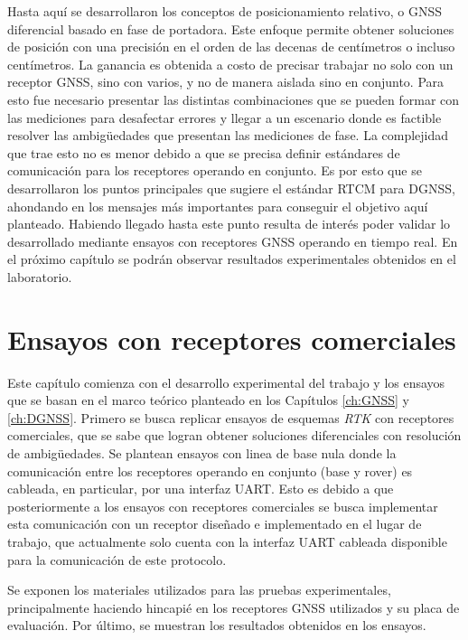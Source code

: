 \documentclass[a4paper,12pt,oneside,onecolumn,final,openright]{book}%
\begin{document}
	Hasta aquí se desarrollaron los conceptos de posicionamiento relativo, o GNSS diferencial basado en fase de portadora. Este enfoque permite obtener soluciones de posición con una precisión en el orden de las decenas de centímetros o incluso centímetros. La ganancia es obtenida a costo de precisar trabajar no solo con un receptor GNSS, sino con varios, y no de manera aislada sino en conjunto. Para esto fue necesario presentar las distintas combinaciones que se pueden formar con las mediciones para desafectar errores y llegar a un escenario donde es factible resolver las ambigüedades que presentan las mediciones de fase. La complejidad que trae esto no es menor debido a que se precisa definir estándares de comunicación para los receptores operando en conjunto. Es por esto que se desarrollaron los puntos principales que sugiere el estándar RTCM para DGNSS, ahondando en los mensajes más importantes para conseguir el objetivo aquí planteado. Habiendo llegado hasta este punto resulta de interés poder validar lo desarrollado mediante ensayos con receptores GNSS operando en tiempo real. En el próximo capítulo se podrán observar resultados experimentales obtenidos en el laboratorio.
\chapter{Ensayos con receptores comerciales}
	Este capítulo comienza con el desarrollo experimental del trabajo y los ensayos que se basan en el marco teórico planteado en los Capítulos \ref{ch:GNSS} y \ref{ch:DGNSS}. Primero se busca replicar ensayos de esquemas \textit{RTK} con receptores comerciales, que se sabe que logran obtener soluciones diferenciales con resolución de ambigüedades. Se plantean ensayos con linea de base nula donde la comunicación entre los receptores operando en conjunto (base y rover) es cableada, en particular, por una interfaz UART. Esto es debido a que posteriormente a los ensayos con receptores comerciales se busca implementar esta comunicación con un receptor diseñado e implementado en el lugar de trabajo, que actualmente solo cuenta con la interfaz UART cableada disponible para la comunicación de este protocolo. 
	
	Se exponen los materiales utilizados para las pruebas experimentales, principalmente haciendo hincapié en los receptores GNSS utilizados y su placa de evaluación. Por último, se muestran los resultados obtenidos en los ensayos.

\end{document}
